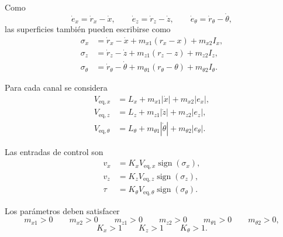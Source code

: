 Como
\[
  \dot e_x=\dot r_x-\dot x,\qquad
  \dot e_z=\dot r_z-\dot z,\qquad
  \dot e_\theta=\dot r_\theta-\dot\theta,
\]
las superficies también pueden escribirse como
\begin{align*}
  \sigma_x
  &=\dot r_x-\dot x+m_{x1}(r_x-x)+m_{x2}I_x,\\
  \sigma_z
  &=\dot r_z-\dot z+m_{z1}(r_z-z)+m_{z2}I_z,\\
  \sigma_\theta
  &=\dot r_\theta-\dot\theta
  +m_{\theta1}(r_\theta-\theta)+m_{\theta2}I_\theta.
\end{align*}

Para cada canal se considera
\begin{align*}
  V_{\mathrm{eq},x}
  &=L_x+m_{x1}|\dot x|+m_{x2}|e_x|,\\
  V_{\mathrm{eq},z}
  &=L_z+m_{z1}|\dot z|+m_{z2}|e_z|,\\
  V_{\mathrm{eq},\theta}
  &=L_\theta+m_{\theta1}|\dot\theta|
  +m_{\theta2}|e_\theta|.
\end{align*}

Las entradas de control son
\begin{align*}
  v_x&=K_x V_{\mathrm{eq},x}
  \operatorname{sign}(\sigma_x),\\
  v_z&=K_z V_{\mathrm{eq},z}
  \operatorname{sign}(\sigma_z),\\
  \tau&=K_\theta V_{\mathrm{eq},\theta}
  \operatorname{sign}(\sigma_\theta).
\end{align*}

Los parámetros deben satisfacer
\[
  m_{x1}>0\qquad m_{x2}>0\qquad
  m_{z1}>0\qquad m_{z2}>0\qquad
  m_{\theta1}>0\qquad m_{\theta2}>0,
\]
\[
  K_x>1\qquad K_z>1\qquad K_\theta>1.
\]